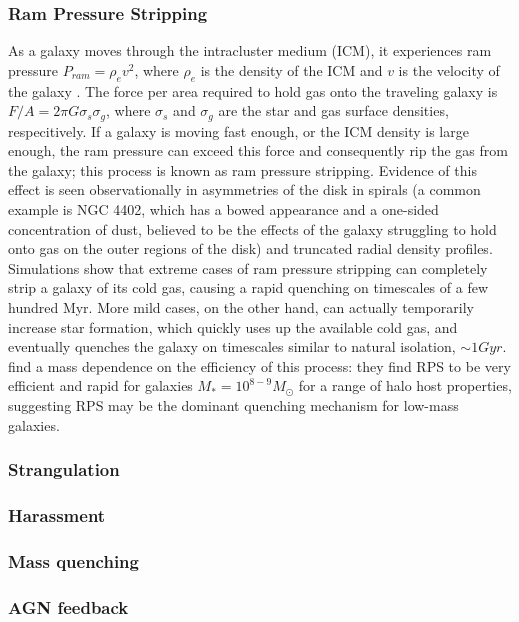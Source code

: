 \subsubsection{Ram Pressure Stripping}

As a galaxy moves through the intracluster medium (ICM), it experiences ram pressure $P_{ram} = \rho_e v^2$, where $\rho_e$ is the density of the ICM and $v$ is the velocity of the galaxy \citep{Gunn1972}. The force per area required to hold gas onto the traveling galaxy is $F/A = 2\pi G \sigma_{s} \sigma_{g}$, where $\sigma_{s}$ and $\sigma_{g}$ are the star and gas surface densities, respecitively. If a galaxy is moving fast enough, or the ICM density is large enough, the ram pressure can exceed this force and consequently rip the gas from the galaxy; this process is known as ram pressure stripping. Evidence of this effect is seen observationally in asymmetries of the disk in spirals (a common example is NGC 4402, which has a bowed appearance and a one-sided concentration of dust, believed to be the effects of the galaxy struggling to hold onto gas on the outer regions of the disk) and truncated radial density profiles. Simulations \citep{Steinhauser2016} show that extreme cases of ram pressure stripping can completely strip a galaxy of its cold gas, causing a rapid quenching on timescales of a few hundred Myr. More mild cases, on the other hand, can actually temporarily increase star formation, which quickly uses up the available cold gas, and eventually quenches the galaxy on timescales similar to natural isolation, $\sim 1Gyr$. \citet{Fillingham2016} find a mass dependence on the efficiency of this process: they find RPS to be very efficient and rapid for galaxies $M_{*} = 10^{8-9}M_{\odot}$ for a range of halo host properties, suggesting RPS may be the dominant quenching mechanism for low-mass galaxies.  

\subsubsection{Strangulation}
\subsubsection{Harassment}
\subsubsection{Mass quenching}
\subsubsection{AGN feedback}
